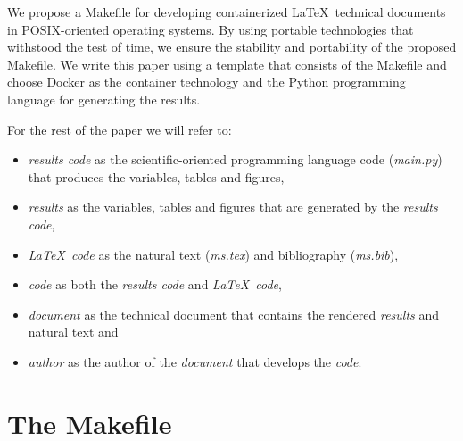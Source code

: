 \documentclass[journal]{IEEEtran}
\begin{document}
We propose a Makefile for developing containerized \LaTeX\ technical documents in POSIX-oriented operating systems.
By using portable technologies that withstood the test of time, we ensure the stability and portability of the proposed Makefile.
We write this paper using a template that consists of the Makefile and choose Docker as the container technology and the Python programming language for generating the results.

For the rest of the paper we will refer to:
\begin{itemize}
	\item \textit{results code} as the scientific-oriented programming language code (\textit{main.py}) that produces the variables, tables and figures,
	\item \textit{results} as the variables, tables and figures that are generated by the \textit{results code},
	\item \textit{\LaTeX\ code} as the natural text (\textit{ms.tex}) and bibliography (\textit{ms.bib}),
	\item \textit{code} as both the \textit{results code} and \textit{\LaTeX\ code},
	\item \textit{document} as the technical document that contains the rendered \textit{results} and natural text and
	\item \textit{author} as the author of the \textit{document} that develops the \textit{code}.
\end{itemize}

\section{The Makefile}
\end{document}
